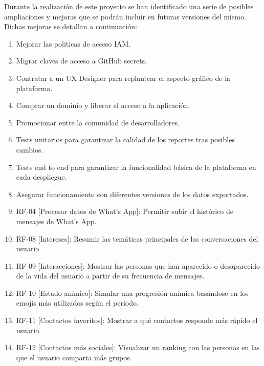 
Durante la realización de este proyecto se han identificado una serie de posibles ampliaciones y mejoras que se podrán incluir en futuras versiones del mismo. Dichas mejoras se detallan a continuación:

\begin{enumerate}
    \item Mejorar las politicas de acceso IAM.
    \item Migrar claves de acceso a GitHub secrets.
    \item Contratar a un UX Designer para replantear el aspecto gráfico de la plataforma.
    \item Comprar un dominio y liberar el acceso a la aplicación.
    \item Promocionar entre la comunidad de desarrolladores.
    \item Tests unitarios para garantizar la calidad de los reportes tras posibles cambios.
    \item Tests end to end para garantizar la funcionalidad básica de la plataforma en cada despliegue.
    \item Asegurar funcionamiento con diferentes versiones de los datos exportados.
    \item RF-04 [Procesar datos de What's App]: Permitir subir el histórico de mensajes de What's App.
    \item RF-08 [Intereses]: Resumir las temáticas principales de las conversaciones del usuario.
    \item RF-09 [Interacciones]: Mostrar las personas que han aparecido o desaparecido de la vida del usuario a partir de su frecuencia de mensajes.
    \item RF-10 [Estado anímico]: Simular una progresión anímica basándose en los emojis más utilizados según el periodo.
    \item RF-11 [Contactos favoritos]: Mostrar a qué contactos responde más rápido el usuario.
    \item RF-12 [Contactos más sociales]: Visualizar un ranking con las personas en las que el usuario comparta más grupos.
\end{enumerate}

